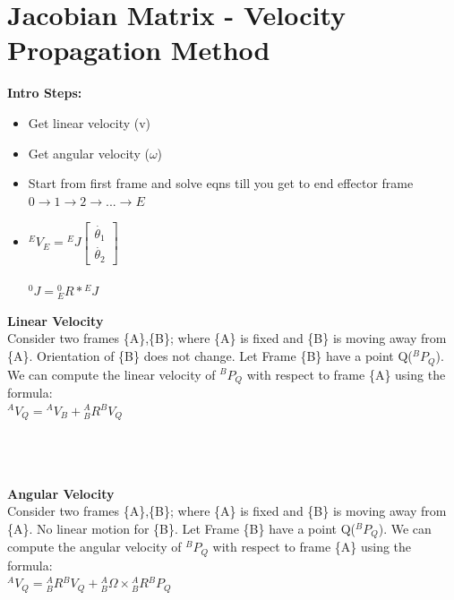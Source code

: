 \documentclass{article}
\begin{document}
\section{Jacobian Matrix - Velocity Propagation Method}
\textbf{Intro Steps:} 
\begin{itemize}
    \item Get linear velocity (v)
    \item Get angular velocity ($\omega$)
    \item Start from first frame and solve eqns till you get to end effector frame $0 \rightarrow 1 \rightarrow 2 \rightarrow ... \rightarrow E$
    \item ${}^E V_E = {}^E J \begin{bmatrix}
         \dot{\theta_1} \\
        \dot{\theta_2} 
    \end{bmatrix}$\\\\
    ${}^0J={}^0_ER * {}^EJ$
\end{itemize}
\textbf{Linear Velocity}\\
Consider two frames \{A\},\{B\}; where \{A\} is fixed  and \{B\} is moving away from \{A\}. Orientation of \{B\} does not change. Let Frame \{B\} have a point Q(${}^BP_Q$). We can compute the linear velocity of ${}^BP_Q$ with respect to frame \{A\} using the formula: \\
${}^AV_Q = {}^AV_B + {}^A_BR {}^BV_Q$

\\\\\\
\textbf{Angular Velocity}\\
Consider two frames \{A\},\{B\}; where \{A\} is fixed  and \{B\} is moving away from \{A\}. No linear motion for \{B\}. Let Frame \{B\} have a point Q(${}^BP_Q$). We can compute the angular velocity of ${}^BP_Q$ with respect to frame \{A\} using the formula: \\
${}^AV_Q = {}^A_BR {}^BV_Q + {}^A_B\Omega \times {}^A_BR {}^BP_Q$
\end{document}
